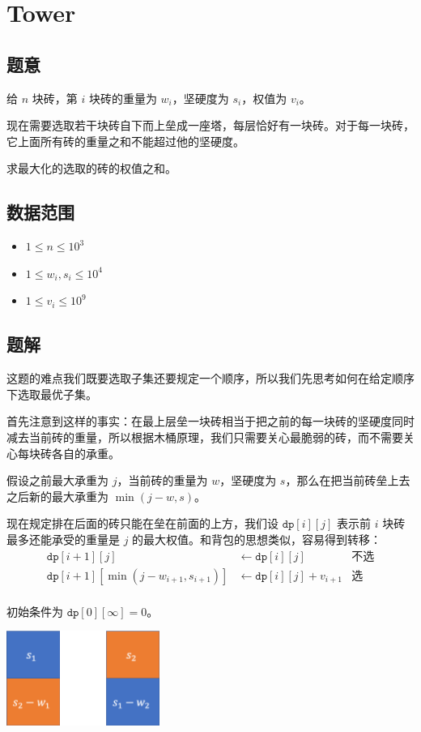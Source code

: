 \section{Tower}
\subsection*{题意}
给 $n$ 块砖，第 $i$ 块砖的重量为 $w_i$，坚硬度为 $s_i$，权值为 $v_i$。

现在需要选取若干块砖自下而上垒成一座塔，每层恰好有一块砖。对于每一块砖，它上面所有砖的重量之和不能超过他的坚硬度。

求最大化的选取的砖的权值之和。
\subsection*{数据范围}
\begin{itemize}
\item $1 \leq n \leq 10^3$
\item $1 \leq w_i, s_i \leq 10^4$
\item $1 \leq v_i \leq 10^9$
\end{itemize}

\subsection*{题解}

这题的难点我们既要选取子集还要规定一个顺序，所以我们先思考如何在给定顺序下选取最优子集。


首先注意到这样的事实：在最上层垒一块砖相当于把之前的每一块砖的坚硬度同时减去当前砖的重量，所以根据木桶原理，我们只需要关心最脆弱的砖，而不需要关心每块砖各自的承重。

假设之前最大承重为 $j$，当前砖的重量为 $w$，坚硬度为 $s$，那么在把当前砖垒上去之后新的最大承重为 $\min(j-w,s)$。

现在规定排在后面的砖只能在垒在前面的上方，我们设 $\texttt{dp}[i][j]$ 表示前 $i$ 块砖最多还能承受的重量是 $j$ 的最大权值。和背包的思想类似，容易得到转移：
\begin{align*}
    \texttt{dp}[i+1][j] &\longleftarrow \texttt{dp}[i][j] &\text{不选} \\
    \texttt{dp}[i+1][\min(j-w_{i+1},s_{i+1})] &\longleftarrow \texttt{dp}[i][j] + v_{i+1}&\text{选}\\
\end{align*}

初始条件为 $\texttt{dp}[0][\infty] = 0$。

\newpage
\begin{center}
\includegraphics[width=5cm]{./Pics/tower.png}
\end{center}
